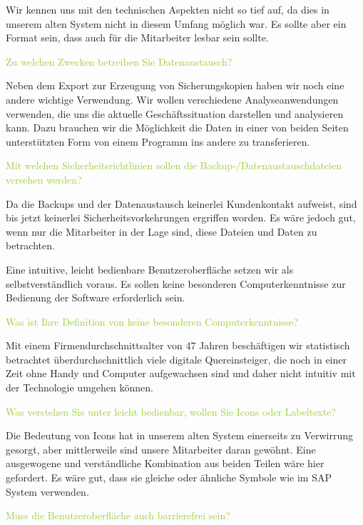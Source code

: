 \textcolor{NavyBlue}{Wir kennen uns mit den technischen Aspekten nicht so tief auf, da dies in unserem alten System nicht in diesem Umfang möglich war. Es sollte aber ein Format sein, dass auch für die Mitarbeiter lesbar sein sollte.}

\textcolor{YellowGreen}{Zu welchen Zwecken betreiben Sie Datenaustausch?}

\textcolor{NavyBlue}{Neben dem Export zur Erzeugung von Sicherungskopien haben wir noch eine andere wichtige Verwendung. Wir wollen verschiedene Analyseanwendungen verwenden, die uns die aktuelle Geschäftssituation darstellen und analysieren kann. Dazu brauchen wir die Möglichkeit die Daten in einer von beiden Seiten unterstützten Form von einem Programm ins andere zu transferieren.}

\textcolor{YellowGreen}{Mit welchen Sicherheitsrichtlinien sollen die Backup-/Datenaustauschdateien versehen werden?}

\textcolor{NavyBlue}{Da die Backups und der Datenaustausch keinerlei Kundenkontakt aufweist, sind bis jetzt keinerlei Sicherheitsvorkehrungen ergriffen worden. Es wäre jedoch gut, wenn nur die Mitarbeiter in der Lage sind, diese Dateien und Daten zu betrachten.}

Eine intuitive, leicht bedienbare Benutzeroberfläche setzen wir als selbstverständlich voraus. 
Es sollen keine besonderen Computerkenntnisse zur Bedienung der Software erforderlich sein.  

\textcolor{YellowGreen}{Was ist Ihre Definition von \grqq{}keine besonderen Computerkenntnisse\grqq{}?}

\textcolor{NavyBlue}{Mit einem Firmendurchschnittsalter von 47 Jahren beschäftigen wir statistisch betrachtet überdurchschnittlich viele digitale Quereinsteiger, die noch in einer Zeit ohne Handy und Computer aufgewachsen sind und daher nicht intuitiv mit der Technologie umgehen können. }

\textcolor{YellowGreen}{Was verstehen Sie unter leicht bedienbar, wollen Sie Icons oder Labeltexte?}

\textcolor{NavyBlue}{Die Bedeutung von Icons hat in unserem alten System einerseits zu Verwirrung gesorgt, aber mittlerweile sind unsere Mitarbeiter daran gewöhnt. Eine ausgewogene und verständliche Kombination aus beiden Teilen wäre hier gefordert. Es wäre gut, dass sie gleiche oder ähnliche Symbole wie im SAP System verwenden.}

\textcolor{YellowGreen}{Muss die Benutzeroberfläche auch barrierefrei sein?}

